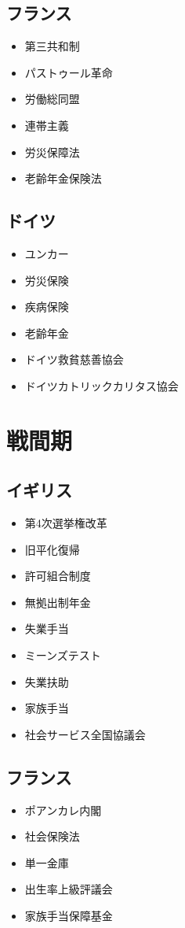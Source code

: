 \documentclass{jsarticle}
\begin{document}
\subsection{フランス}
\begin{itemize}
	\item 第三共和制
	\item パストゥール革命
	\item 労働総同盟
	\item 連帯主義
	\item 労災保障法
	\item 老齢年金保険法
\end{itemize}

\subsection{ドイツ}
\begin{itemize}
	\item ユンカー
	\item 労災保険
	\item 疾病保険
	\item 老齢年金
	\item ドイツ救貧慈善協会
	\item ドイツカトリックカリタス協会
\end{itemize}


\section{戦間期}

\subsection{イギリス}
\begin{itemize}
	\item 第4次選挙権改革
	\item 旧平化復帰
	\item 許可組合制度
	\item 無拠出制年金
	\item 失業手当
	\item ミーンズテスト
	\item 失業扶助
	\item 家族手当
	\item 社会サービス全国協議会
\end{itemize}

\subsection{フランス}
\begin{itemize}
	\item ポアンカレ内閣
	\item 社会保険法
	\item 単一金庫
	\item 出生率上級評議会
	\item 家族手当保障基金
\end{itemize}
\end{document}
